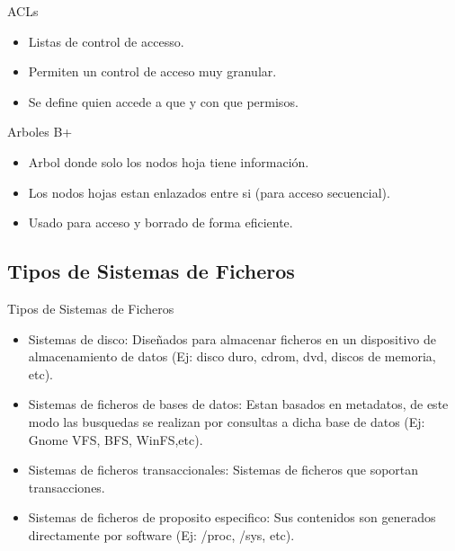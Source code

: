 \begin{frame}{ACLs}
  \begin{itemize}
    \item Listas de control de accesso.
    \item Permiten un control de acceso muy granular.
    \item Se define quien accede a que y con que permisos.
  \end{itemize}
\end{frame}

\begin{frame}{Arboles B+}
  \begin{itemize}
    \item Arbol donde solo los nodos hoja tiene información.
    \item Los nodos hojas estan enlazados entre si (para acceso secuencial).
    \item Usado para acceso y borrado de forma eficiente.
  \end{itemize}
\end{frame}

\subsection*{Tipos de Sistemas de Ficheros}
\begin{frame}{Tipos de Sistemas de Ficheros}
  \begin{itemize}
    \item Sistemas de disco: Diseñados para almacenar ficheros en un dispositivo de almacenamiento de datos (Ej: disco duro, cdrom, dvd, discos de memoria, etc).
    \item Sistemas de ficheros de bases de datos: Estan basados en metadatos, de este modo las busquedas se realizan por consultas a dicha base de datos (Ej: Gnome VFS, BFS, WinFS,etc).
    \item Sistemas de ficheros transaccionales: Sistemas de ficheros que soportan transacciones.
    \item Sistemas de ficheros de proposito especifico: Sus contenidos son generados directamente por software (Ej: /proc, /sys, etc).
  \end{itemize}
\end{frame}
